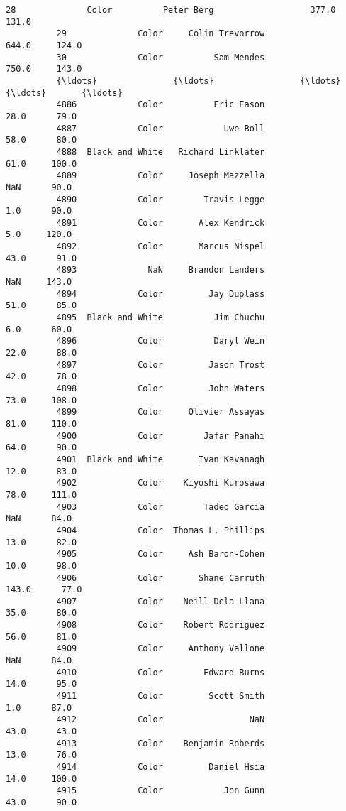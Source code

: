 \documentclass[11pt]{article}
\begin{document}
\begin{Verbatim}[commandchars=\\\{\}]
          28              Color          Peter Berg                   377.0     131.0   
          29              Color     Colin Trevorrow                   644.0     124.0   
          30              Color          Sam Mendes                   750.0     143.0   
          {\ldots}               {\ldots}                 {\ldots}                     {\ldots}       {\ldots}   
          4886            Color          Eric Eason                    28.0      79.0   
          4887            Color            Uwe Boll                    58.0      80.0   
          4888  Black and White   Richard Linklater                    61.0     100.0   
          4889            Color     Joseph Mazzella                     NaN      90.0   
          4890            Color        Travis Legge                     1.0      90.0   
          4891            Color       Alex Kendrick                     5.0     120.0   
          4892            Color       Marcus Nispel                    43.0      91.0   
          4893              NaN     Brandon Landers                     NaN     143.0   
          4894            Color         Jay Duplass                    51.0      85.0   
          4895  Black and White          Jim Chuchu                     6.0      60.0   
          4896            Color          Daryl Wein                    22.0      88.0   
          4897            Color         Jason Trost                    42.0      78.0   
          4898            Color         John Waters                    73.0     108.0   
          4899            Color     Olivier Assayas                    81.0     110.0   
          4900            Color        Jafar Panahi                    64.0      90.0   
          4901  Black and White       Ivan Kavanagh                    12.0      83.0   
          4902            Color    Kiyoshi Kurosawa                    78.0     111.0   
          4903            Color        Tadeo Garcia                     NaN      84.0   
          4904            Color  Thomas L. Phillips                    13.0      82.0   
          4905            Color     Ash Baron-Cohen                    10.0      98.0   
          4906            Color       Shane Carruth                   143.0      77.0   
          4907            Color    Neill Dela Llana                    35.0      80.0   
          4908            Color    Robert Rodriguez                    56.0      81.0   
          4909            Color     Anthony Vallone                     NaN      84.0   
          4910            Color        Edward Burns                    14.0      95.0   
          4911            Color         Scott Smith                     1.0      87.0   
          4912            Color                 NaN                    43.0      43.0   
          4913            Color    Benjamin Roberds                    13.0      76.0   
          4914            Color         Daniel Hsia                    14.0     100.0   
          4915            Color            Jon Gunn                    43.0      90.0   
          

\end{Verbatim}
\end{document}
